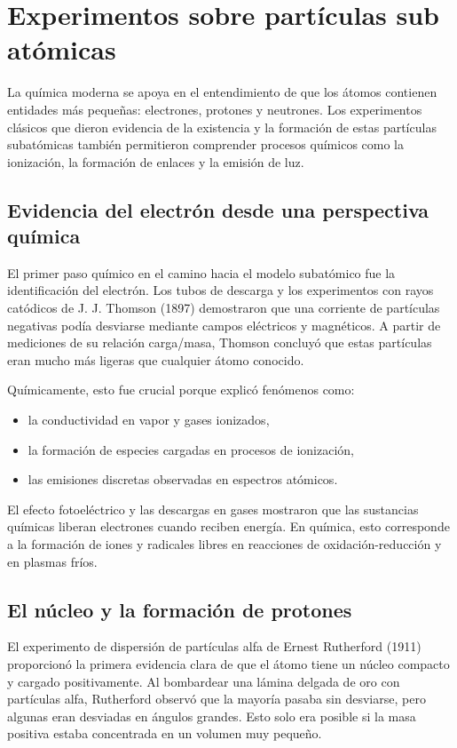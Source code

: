 \documentclass{article}
\begin{document}
    \portada{}
    \newpage
    
    \section{Experimentos sobre partículas sub atómicas}

    La química moderna se apoya en el entendimiento de que los átomos contienen entidades más pequeñas: electrones, protones y neutrones. Los experimentos clásicos que dieron evidencia de la existencia y la formación de estas partículas subatómicas también permitieron comprender procesos químicos como la ionización, la formación de enlaces y la emisión de luz.

    \subsection{Evidencia del electrón desde una perspectiva química}

    El primer paso químico en el camino hacia el modelo subatómico fue la identificación del electrón. Los tubos de descarga y los experimentos con rayos catódicos de J. J. Thomson (1897) demostraron que una corriente de partículas negativas podía desviarse mediante campos eléctricos y magnéticos. A partir de mediciones de su relación carga/masa, Thomson concluyó que estas partículas eran mucho más ligeras que cualquier átomo conocido.

    Químicamente, esto fue crucial porque explicó fenómenos como:
    \begin{itemize}
        \item la conductividad en vapor y gases ionizados,
        \item la formación de especies cargadas en procesos de ionización,
        \item las emisiones discretas observadas en espectros atómicos.
    \end{itemize}

    El efecto fotoeléctrico y las descargas en gases mostraron que las sustancias químicas liberan electrones cuando reciben energía. En química, esto corresponde a la formación de iones y radicales libres en reacciones de oxidación-reducción y en plasmas fríos.

    \subsection{El núcleo y la formación de protones}

    El experimento de dispersión de partículas alfa de Ernest Rutherford (1911) proporcionó la primera evidencia clara de que el átomo tiene un núcleo compacto y cargado positivamente. Al bombardear una lámina delgada de oro con partículas alfa, Rutherford observó que la mayoría pasaba sin desviarse, pero algunas eran desviadas en ángulos grandes. Esto solo era posible si la masa positiva estaba concentrada en un volumen muy pequeño.
\end{document}
